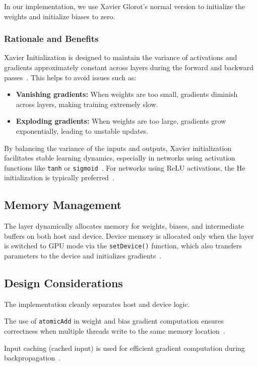 In our implementation, we use Xavier Glorot's normal version to initialize the weights and initialize biases to zero.

\subsubsection*{Rationale and Benefits}

Xavier Initialization is designed to maintain the variance of activations and gradients approximately constant across layers during the forward and backward passes~\cite{glorot2010understanding, stanford_xavier}. This helps to avoid issues such as:

\begin{itemize}
    \item \textbf{Vanishing gradients:} When weights are too small, gradients diminish across layers, making training extremely slow.
    \item \textbf{Exploding gradients:} When weights are too large, gradients grow exponentially, leading to unstable updates.
\end{itemize}

By balancing the variance of the inputs and outputs, Xavier initialization facilitates stable learning dynamics, especially in networks using activation functions like \texttt{tanh} or \texttt{sigmoid}~\cite{goodfellow2016deep}. For networks using ReLU activations, the He initialization is typically preferred~\cite{goodfellow2016deep}.

\subsection{Memory Management}

The layer dynamically allocates memory for weights, biases, and intermediate buffers on both host and device. Device memory is allocated only when the layer is switched to GPU mode via the \texttt{setDevice()} function, which also transfers parameters to the device and initializes gradients~\cite{nvidia_cudnn, digitalocean_gpu_opt}.

\subsection{Design Considerations}

The implementation cleanly separates host and device logic.

The use of \texttt{atomicAdd} in weight and bias gradient computation ensures correctness when multiple threads write to the same memory location~\cite{nvidia_cudnn}.

Input caching (cached input) is used for efficient gradient computation during backpropagation~\cite{goodfellow2016deep}.
